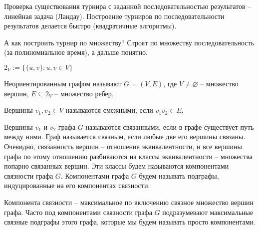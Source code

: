 	\begin{Rem}
		Проверка существования турнира с заданной последовательностью результатов -- линейная задача (Ландау). Построение турниров по последовательности результатов делается быстро (квадратичные алгоритмы).
	\end{Rem}

	\begin{Rem}
		А как построить турнир по множеству? Строят по множеству последовательность (за полиномиальное время), а дальше понятно.
	\end{Rem}


	\begin{notation}
		$2_V := \{\{u, v\} : u, v \in V\}$ 
	\end{notation}

	\begin{Def}
		Неориентированным графом называют $G = (V, E)$, где $V \neq \varnothing$ -- множество вершин, $E \subseteq 2_V$ -- множество ребер.  
	\end{Def}

	\begin{Def}
		Вершины $v_1, v_2 \in V$ называются смежными, если $v_1 v_2 \in E$.
	\end{Def}

	\begin{Def}
		Вершины $v_1 $ и $v_2$ графа $G$ называются связанными, если в графе существует путь между ними.
		Граф называется связным, если любые две его вершины связаны. Очевидно, связанность вершин -- отношение эквивалентности, и все вершины графа по этому отношению разбиваются на классы эквивалентности -- множества попарно связанных вершин.
		Эти классы будем называются компонентами связности графа $G$. Компонентами графа $G$ будем называть подграфы, индуцированные на его компонентах связности. 
	\end{Def}

	\begin{Rem}
		Компонента связности -- максимальное по включению связное множество вершин графа. Часто под компонентами связности графа $G$ подразумевают максимальные
		связные подграфы этого графа, которые мы будем называть просто компонентами.
	\end{Rem}

